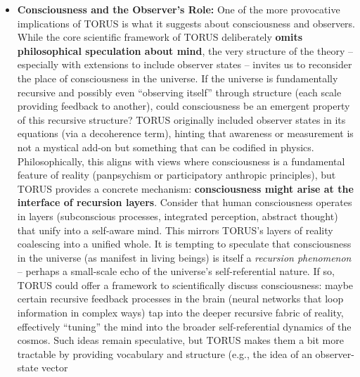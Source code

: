\documentclass[
]{article}
\begin{document}
{\begin{itemize}
  trigger. TORUS, by eliminating any boundary in time, essentially says
  the universe \textbf{just is}, and its existence is justified by its
  internal consistency rather than an external cause. This might be the
  ultimate completion of the Enlightenment quest for a causally closed
  description of reality: every effect has a cause and all causes and
  effects together form the self-existent whole.
\item
  \textbf{Consciousness and the Observer's Role:} One of the more
  provocative implications of TORUS is what it suggests about
  consciousness and observers. While the core scientific framework of
  TORUS deliberately \textbf{omits philosophical speculation about
  mind}\hspace{0pt}, the very structure of the theory -- especially with
  extensions to include observer states -- invites us to reconsider the
  place of consciousness in the universe. If the universe is
  fundamentally recursive and possibly even ``observing itself'' through
  structure (each scale providing feedback to another), could
  consciousness be an emergent property of this recursive structure?
  TORUS originally included observer states in its equations (via a
  decoherence term)\hspace{0pt}, hinting that awareness or measurement
  is not a mystical add-on but something that can be codified in
  physics. Philosophically, this aligns with views where consciousness
  is a fundamental feature of reality (panpsychism or participatory
  anthropic principles), but TORUS provides a concrete mechanism:
  \textbf{consciousness might arise at the interface of recursion
  layers}. Consider that human consciousness operates in layers
  (subconscious processes, integrated perception, abstract thought) that
  unify into a self-aware mind. This mirrors TORUS's layers of reality
  coalescing into a unified whole. It is tempting to speculate that
  consciousness in the universe (as manifest in living beings) is itself
  a \emph{recursion phenomenon} -- perhaps a small-scale echo of the
  universe's self-referential nature. If so, TORUS could offer a
  framework to scientifically discuss consciousness: maybe certain
  recursive feedback processes in the brain (neural networks that loop
  information in complex ways) tap into the deeper recursive fabric of
  reality, effectively ``tuning'' the mind into the broader
  self-referential dynamics of the cosmos. Such ideas remain
  speculative, but TORUS makes them a bit more tractable by providing
  vocabulary and structure (e.g., the idea of an observer-state vector

\end{itemize}}
\end{document}
